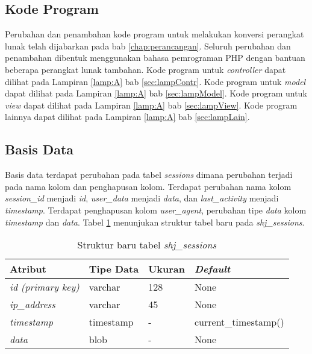 \subsection{Kode Program}
Perubahan dan penambahan kode program untuk melakukan konversi perangkat lunak telah dijabarkan pada bab \ref{chap:perancangan}. Seluruh perubahan dan penambahan dibentuk menggunakan bahasa pemrograman PHP dengan bantuan beberapa perangkat lunak tambahan. Kode program untuk \textit{controller} dapat dilihat pada Lampiran \ref{lamp:A} bab \ref{sec:lampContr}. Kode program untuk \textit{model} dapat dilihat pada Lampiran \ref{lamp:A} bab \ref{sec:lampModel}. Kode program untuk \textit{view} dapat dilihat pada Lampiran \ref{lamp:A} bab \ref{sec:lampView}. Kode program lainnya dapat dilihat pada Lampiran \ref{lamp:A} bab \ref{sec:lampLain}.

\subsection{Basis Data}
Basis data terdapat perubahan pada tabel \textit{sessions} dimana perubahan terjadi pada nama kolom dan penghapusan kolom. Terdapat perubahan nama kolom \textit{session\_id} menjadi \textit{id}, \textit{user\_data} menjadi \textit{data}, dan \textit{last\_activity} menjadi \textit{timestamp}. Terdapat penghapusan kolom \textit{user\_agent}, perubahan tipe \textit{data} kolom \textit{timestamp} dan \textit{data}. Tabel \ref{tab:shjsessionbab5} menunjukan struktur tabel baru pada \textit{shj\_sessions}.

\begin{table}[H]
\centering
\caption{Struktur baru tabel \textit{shj\_sessions}}
\label{tab:shjsessionbab5}
\begin{tabular}{|l|l|l|l|}
\hline
\textbf{Atribut}          & \textbf{Tipe Data} & \textbf{Ukuran} & \textit{\textbf{Default}} \\ \hline
\textit{id (primary key)} & varchar            & 128             & None                      \\ \hline
\textit{ip\_address}       & varchar            & 45              & None                      \\ \hline
\textit{timestamp}        & timestamp          & -               & current\_timestamp()       \\ \hline
\textit{data}             & blob               & -               & None                      \\ \hline
\end{tabular}
\end{table}


